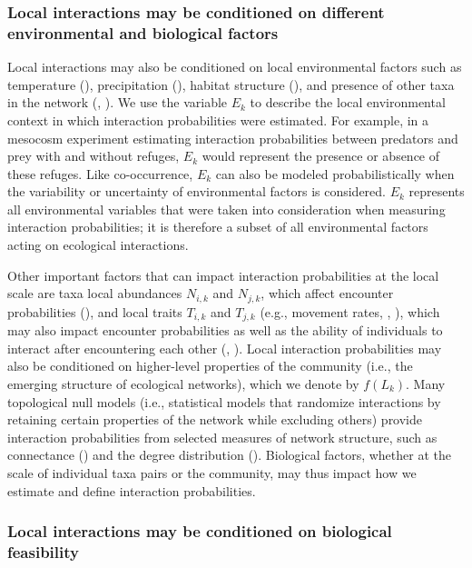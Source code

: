 \subsubsection{Local interactions may be conditioned on different environmental and biological factors}

Local interactions may also be conditioned on local environmental factors such
as temperature (\cite{Angilletta2004Temperature}), precipitation
(\cite{Woodward2012Climate}), habitat structure (\cite{Klecka2014Effect}), and
presence of other taxa in the network (\cite{Pilosof2017Multilayer},
\cite{Kefi2012More}). We use the variable $E_k$ to describe the local
environmental context in which interaction probabilities were estimated. For
example, in a mesocosm experiment estimating interaction probabilities between
predators and prey with and without refuges, $E_k$ would represent the presence
or absence of these refuges. Like co-occurrence, $E_k$ can also be modeled
probabilistically when the variability or uncertainty of environmental factors
is considered. $E_k$ represents all environmental variables that were taken into
consideration when measuring interaction probabilities; it is therefore a subset
of all environmental factors acting on ecological interactions. 

Other important factors that can impact interaction probabilities at the local
scale are taxa local abundances $N_{i,k}$ and $N_{j,k}$, which affect encounter
probabilities (\cite{Canard2012Emergence}), and local traits $T_{i,k}$ and
$T_{j,k}$ (e.g., movement rates, \cite{Beardsell2021Derivation},
\cite{Cherif2024Environment}), which may also impact encounter probabilities as
well as the ability of individuals to interact after encountering each other
(\cite{Caron2024Traitmatching}, \cite{Poisot2015Species}). Local interaction
probabilities may also be conditioned on higher-level properties of the
community (i.e., the emerging structure of ecological networks), which we denote
by $f(L_k)$. Many topological null models (i.e., statistical models that
randomize interactions by retaining certain properties of the network while
excluding others) provide interaction probabilities from selected measures of
network structure, such as connectance (\cite{Fortuna2006Habitat}) and the
degree distribution (\cite{Bascompte2003Nested}). Biological factors, whether at
the scale of individual taxa pairs or the community, may thus impact how we
estimate and define interaction probabilities.

\subsubsection{Local interactions may be conditioned on biological feasibility}

